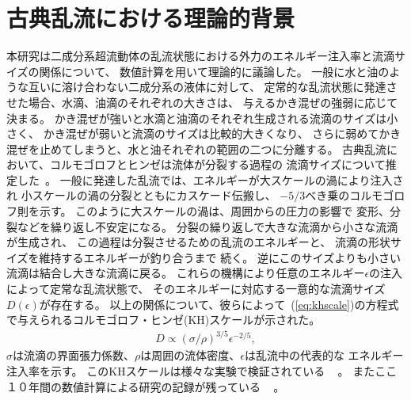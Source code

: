 \documentclass[12pt,a4paper]{jbook}
\begin{document}
		\section{古典乱流における理論的背景}
        本研究は二成分系超流動体の乱流状態における外力のエネルギー注入率と流滴サイズの関係について、
        数値計算を用いて理論的に議論した。
		一般に水と油のような互いに溶け合わない二成分系の液体に対して、
        定常的な乱流状態に発達させた場合、水滴、油滴のそれぞれの大きさは、
		与えるかき混ぜの強弱に応じて決まる。
        かき混ぜが強いと水滴と油滴のそれぞれ生成される流滴のサイズは小さく、
        かき混ぜが弱いと流滴のサイズは比較的大きくなり、
        さらに弱めてかき混ぜを止めてしまうと、水と油それぞれの範囲の二つに分離する。
        古典乱流において、コルモゴロフとヒンゼは流体が分裂する過程の
        流滴サイズについて推定した~\cite{Kolmogorov49,Hinze}。
        一般に発達した乱流では、エネルギーが大スケールの渦により注入され
        小スケールの渦の分裂とともにカスケード伝搬し、
        $-5/3$べき乗のコルモゴロフ則を示す。
        このように大スケールの渦は、周囲からの圧力の影響で
        変形、分裂などを繰り返し不安定になる。
        分裂の繰り返しで大きな流滴から小さな流滴が生成され、
        この過程は分裂させるための乱流のエネルギーと、
        流滴の形状サイズを維持するエネルギーが釣り合うまで
        続く。
        逆にこのサイズよりも小さい流滴は結合し大きな流滴に戻る。
        これらの機構により任意のエネルギー$\epsilon$の注入によって定常な乱流状態で、
        そのエネルギーに対応する一意的な流滴サイズ$D(\epsilon)$が存在する。
        以上の関係について、彼らによって~(\ref{eq:khscale})の方程式で与えられるコルモゴロフ・ヒンゼ(KH)スケールが示された。
        \begin{eqnarray}
            \label{eq:khscale}
            D \propto (\sigma/\rho)^{3/5} \epsilon^{-2/5},
        \end{eqnarray}
        $\sigma$は流滴の界面張力係数、$\rho$は周囲の流体密度、$\epsilon$は乱流中の代表的な
        エネルギー注入率を示す。
        このKHスケールは様々な実験で検証されている
        ~\cite{Clay, Shinnar, Sleicher, Arai, Deane}
        。
        またここ１０年間の数値計算による研究の記録が残っている
        ~\cite{Perlekar12, Skartlien, Perlekar14, Fan, Perlekar17, Rosti}
        。
\end{document}
